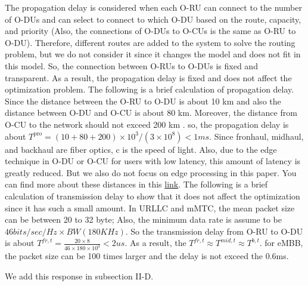 \documentclass[12pt, letterpaper]{article}
\begin{document}
The propagation delay is considered when each O-RU can connect to the number of O-DUs and can select to connect to which O-DU based on the route, capacity, and priority (Also, the connections of O-DUs to O-CUs is the same as O-RU to O-DU). Therefore, different routes are added to the system to solve the routing problem, but we do not consider it since it changes the model and does not fit in this model. So, the connection between O-RUs to O-DUs is fixed and transparent. As a result, the propagation delay is fixed and does not affect the optimization problem.
The following is a brief calculation of propagation delay.
Since the distance between the O-RU to O-DU is about 10 km and also the distance between O-DU and O-CU is about 80 km. Moreover, the distance from O-CU to the network should not exceed 200 km \cite{oranD1}. so, the propagation delay is about $T^{\text{pro}} = (10 + 80 + 200)\times 10^3 /(3\times 10^8) < 1ms $. Since fronhaul, midhaul, and backhaul are fiber optics, c is the speed of light. Also, due to the edge technique in O-DU or O-CU for users with low latency, this amount of latency is greatly reduced. But we also do not focus on edge processing in this paper. You can find more about these distances in this \href{https://blogs.keysight.com/blogs/inds.entry.html/2020/06/30/5g_testing_what_is-0nzj.html\%23:~:text=The\%20data\%20requirements\%20are\%20about,DUs\%20is\%20about\%2080\%20km.}{link}.
The following is a brief calculation of transmission delay to show that it does not affect the optimization since it has such a small amount.
In URLLC and mMTC, the mean packet size can be between 20 to 32 byte; Also, the minimum data rate is assume to be $46 bits/sec/Hz \times BW (180 KHz)$. So the transmission delay from O-RU to O-DU is about $T^{fr,t} = \frac{20\times 8}{46 \times 180 \times 10^3} < 2 us$. As a result, the $T^{fr,t} \approx T^{mid,t} \approx T^{b,t}$. for eMBB, the packet size can be 100 times larger and the delay is not exceed the 0.6ms.  

We add this response in subsection II-D.
\end{document}
